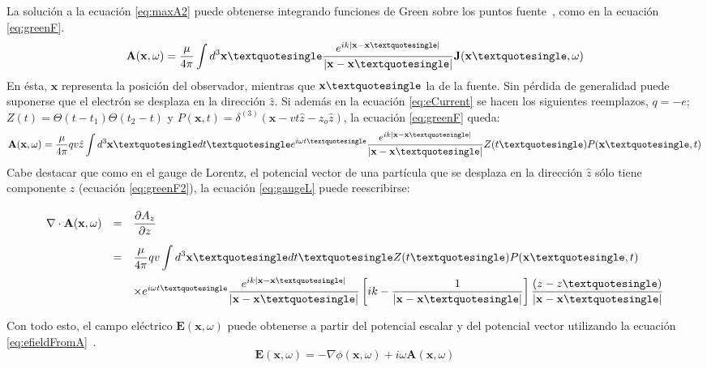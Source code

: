 La soluci\'on a la ecuaci\'on \ref{eq:maxA2} puede obtenerse integrando funciones de Green sobre los puntos fuente~\cite{jackson:1998}, como en la ecuaci\'on \ref{eq:greenF}.
%
\begin{equation}
\mathbf{A}(\mathbf{x},\omega)=\frac{\mu}{4\pi}\int d^3\mathbf{x}\textquotesingle
\frac{e^{ik|\mathbf{x}-\mathbf{x}\textquotesingle|}}{|\mathbf{x}-\mathbf{x}\textquotesingle|}
\mathbf{J}(\mathbf{x}\textquotesingle,\omega)
\label{eq:greenF}
\end{equation}
%
En \'esta, $\mathbf{x}$ representa la posici\'on del observador, mientras que $\mathbf{x}\textquotesingle$ la de la fuente.
Sin p\'erdida de generalidad puede suponerse que el electr\'on se desplaza en la direcci\'on $\hat z$. 
Si adem\'as en la ecuaci\'on \ref{eq:eCurrent} se hacen los siguientes reemplazos, $q=-e$; $Z(t)=\Theta(t-t_1)\Theta(t_2-t)$ y $P(\mathbf{x},t)=\delta^{(3)}(\mathbf{x}-vt\hat z-z_o\hat z)$, la ecuaci\'on \ref{eq:greenF} queda:
%
\begin{equation}
\mathbf{A}(\mathbf{x},\omega)=\frac{\mu}{4\pi}
qv\hat z
\int d^3\mathbf{x}\textquotesingle
dt\textquotesingle e^{i\omega t\textquotesingle}
\frac{e^{ik|\mathbf{x}-\mathbf{x}\textquotesingle|}}{|\mathbf{x}-\mathbf{x}\textquotesingle|}
Z(t\textquotesingle)P(\mathbf{x}\textquotesingle,t)
\label{eq:greenF2}
\end{equation}
%
Cabe destacar que como en el gauge de Lorentz, el potencial vector de una part\'icula que se desplaza en la direcci\'on $\hat{z}$ s\'olo tiene componente $z$ (ecuaci\'on \ref{eq:greenF2}), la ecuaci\'on \ref{eq:gaugeL} puede reescribirse:
%
\begin{equation}
	\renewcommand{\arraystretch}{2.5}
	\begin{array}{rcl}
	\nabla\cdot\mathbf{A}(\mathbf{x},\omega)&=&\dfrac{\partial A_z}{\partial z}\\
	&=&
	\dfrac{\mu}{4\pi}qv
	\displaystyle\int d^3\mathbf{x}\textquotesingle dt\textquotesingle
	Z(t\textquotesingle)P(\mathbf{x}\textquotesingle,t)\\
	& & \times
	e^{i\omega t\textquotesingle}
	\dfrac{e^{ik|\mathbf{x}-\mathbf{x}\textquotesingle|}}{|\mathbf{x}-\mathbf{x}\textquotesingle|}
	\left[ik-\dfrac{1}{|\mathbf{x}-\mathbf{x}\textquotesingle|}\right]
	\dfrac{(z-z\textquotesingle)}{|\mathbf{x}-\mathbf{x}\textquotesingle|}
	\end{array}
\label{eq:gaugeL2}
\end{equation}
%

Con todo esto, el campo el\'ectrico $\mathbf{E}(\mathbf{x},\omega)$ puede obtenerse a partir del potencial escalar y del potencial vector utilizando la ecuaci\'on \ref{eq:efieldFromA}~\cite{jackson:1998}.
%
\begin{equation}
	\mathbf{E}(\mathbf{x},\omega) = 
	-\nabla\phi(\mathbf{x},\omega) 
	+
	i\omega\mathbf{A}(\mathbf{x},\omega)
	\label{eq:efieldFromA}
\end{equation}
%


